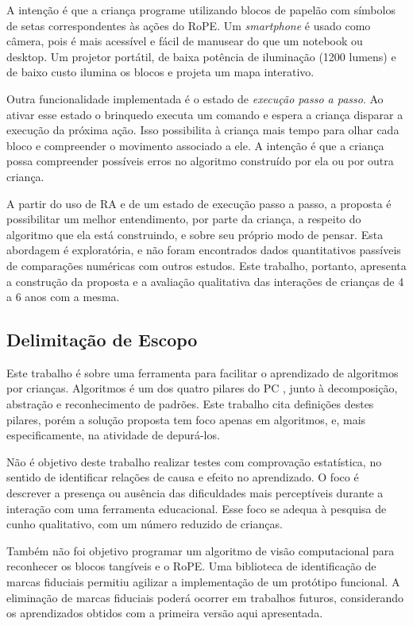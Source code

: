 A intenção é que a criança programe utilizando blocos de papelão com símbolos de setas correspondentes às ações do RoPE. Um \textit{smartphone} é usado como câmera, pois é mais acessível e fácil de manusear do que um notebook ou desktop. Um projetor portátil, de baixa potência de iluminação (1200 lumens) e de baixo custo ilumina os blocos e projeta um mapa interativo.

Outra funcionalidade implementada é o estado de \textit{execução passo a passo}. Ao ativar esse estado o brinquedo executa um comando e espera a criança disparar a execução da próxima ação. Isso possibilita à criança mais tempo para olhar cada bloco e compreender o movimento associado a ele. A intenção é que a criança possa compreender possíveis erros no algoritmo construído por ela ou por outra criança.

A partir do uso de RA e de um estado de execução passo a passo, a proposta é possibilitar um melhor entendimento, por parte da criança, a respeito do algoritmo que ela está construindo, e sobre seu próprio modo de pensar. Esta abordagem é exploratória, e não foram encontrados dados quantitativos passíveis de comparações numéricas com outros estudos. Este trabalho, portanto, apresenta a construção da proposta e a avaliação qualitativa das interações de crianças de 4 a 6 anos com a mesma.

\subsection{Delimitação de Escopo}
\label{ss_cintro_escopo}

Este trabalho é sobre uma ferramenta para facilitar o aprendizado de algoritmos por crianças. Algoritmos é um dos quatro pilares do \acl{PC} \cite{brackmann_desenvolvimento_2017}, junto à decomposição, abstração e reconhecimento de padrões. Este trabalho cita definições destes pilares, porém a solução proposta tem foco apenas em algoritmos, e, mais especificamente, na atividade de depurá-los.

Não é objetivo deste trabalho realizar testes com comprovação estatística, no sentido de identificar relações de causa e efeito no aprendizado. O foco é descrever a presença ou ausência das dificuldades mais perceptíveis durante a interação com uma ferramenta educacional. Esse foco se adequa à pesquisa de cunho qualitativo, com um número reduzido de crianças.

Também não foi objetivo programar um algoritmo de visão computacional para reconhecer os blocos tangíveis e o RoPE. Uma biblioteca de identificação de marcas fiduciais permitiu agilizar a implementação de um protótipo funcional. A eliminação de marcas fiduciais poderá ocorrer em trabalhos futuros, considerando os aprendizados obtidos com a primeira versão aqui apresentada.

